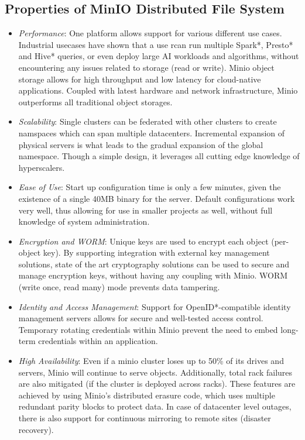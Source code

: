 \documentclass{article}
\begin{document}
\subsection{Properties of MinIO Distributed File System}
\begin{itemize}
    \item \textit{Performance}: One platform allows support for various different use cases. Industrial usecases have shown that a use rcan run  multiple Spark*, Presto* and Hive* queries, or even deploy large AI workloads and algorithms, without encountering any issues related to storage (read or write). Minio object storage allows for high throughput and low latency for cloud-native applications. Coupled with latest hardware and network infrastructure, Minio outperforms all traditional object storages. 
    \item \textit{Scalability}: Single clusters can be federated with other clusters to create namspaces which can span multiple datacenters. Incremental expansion of physical servers is what leads to the gradual expansion of the global namespace. Though a simple design, it leverages all cutting edge knowledge of hyperscalers. 
    \item \textit{Ease of Use}: Start up configuration time is only a few minutes, given the existence of a single 40MB binary for the server. Default configurations work very well, thus allowing for use in smaller projects as well, without full knowledge of system administration. 
    \item \textit{Encryption and WORM}: Unique keys are used to encrypt each object (per-object key). By supporting integration with external key management solutions, state of the art cryptography solutions can be used to secure and manage encryption keys, without having any coupling with Minio. WORM (write once, read many) mode prevents data tampering.
    \item \textit{Identity and Access Management}: Support for OpenID*-compatible identity management servers allows for secure and well-tested access control. Temporary rotating credentials within Minio prevent the need to embed long-term credentials within an application. 
    \item \textit{High Availability}: Even if a minio cluster loses up to 50\% of its drives and servers, Minio will continue to serve objects. Additionally, total rack failures are also mitigated (if the cluster is deployed across racks). These features are achieved by using Minio's distributed erasure code, which uses multiple redundant parity blocks to protect data. In case of datacenter level outages, there is also support for continuous mirroring to remote sites (disaster recovery). 

\end{itemize}
\end{document}
